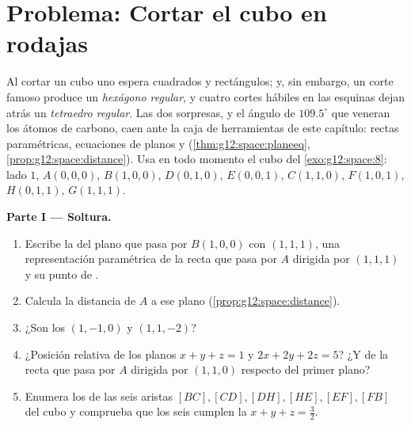 \section{Problema: Cortar el cubo en rodajas}

\begin{problem}
\label{pb:g12:space:1}
Al cortar un cubo uno espera cuadrados y rectángulos; y, sin embargo, un
corte famoso produce un \emph{hexágono regular}, y cuatro cortes hábiles en
las esquinas dejan atrás un \emph{tetraedro regular}. Las dos sorpresas, y
el ángulo de $109.5^\circ$ que veneran los átomos de carbono, caen ante la
caja de herramientas de este capítulo: rectas paramétricas, ecuaciones de
planos y  (\cref{thm:g12:space:planeeq},
\cref{prop:g12:space:distance}). Usa en todo momento el cubo del
\cref{exo:g12:space:8}: lado $1$, $A(0,0,0)$, $B(1,0,0)$, $D(0,1,0)$,
$E(0,0,1)$, $C(1,1,0)$, $F(1,0,1)$, $H(0,1,1)$, $G(1,1,1)$.

\medskip
\noindent\textbf{Parte I --- Soltura.}
\begin{enumerate}
  \item Escribe la  del plano que pasa por $B(1,0,0)$ con  $(1,1,1)$, una representación paramétrica de la recta que
        pasa por $A$ dirigida por $(1,1,1)$ y su punto de .
  \item Calcula la distancia de $A$ a ese plano
        (\cref{prop:g12:space:distance}).
  \item ¿Son  los  $(1,-1,0)$ y $(1,1,-2)$?
  \item ¿Posición relativa de los planos $x + y + z = 1$ y
        $2x + 2y + 2z = 5$? ¿Y de la recta que pasa por $A$ dirigida por
        $(1,1,0)$ respecto del primer plano?
  \item Enumera los  de las seis aristas
        $[BC], [CD], [DH], [HE], [EF], [FB]$ del cubo y comprueba que los
        seis cumplen la  $x + y + z = \frac32$.
\end{enumerate}


\end{problem}
